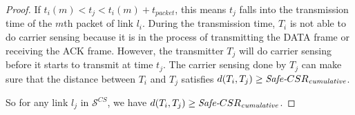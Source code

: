 \documentclass[conference]{IEEEtran}
\begin{document}
\begin{proof}
If $t_i(m)< t_j<t_i(m)+t_{packet}$, this means $t_j$ falls into the
transmission time of the $m$th packet of link $l_i$. During the
transmission time, $T_i$ is not able to do carrier sensing because
it is in the process of transmitting the DATA frame or receiving the
ACK frame. However, the transmitter $T_j$ will do carrier sensing
before it starts to transmit at time $t_j$. The carrier sensing done
by $T_j$ can make sure that the distance between $T_i$ and $T_j$
satisf\/ies $d(T_i,T_j)\geq
\text{\emph{Safe-}}CSR_\text{\emph{cumulative}}$.

So for any link $l_j$ in $\mathcal{S}^{ CS}$, we have
$d(T_i,T_j)\geq \text{\emph{Safe-}}CSR_\text{\emph{cumulative}}$.



\end{proof}
\end{document}

